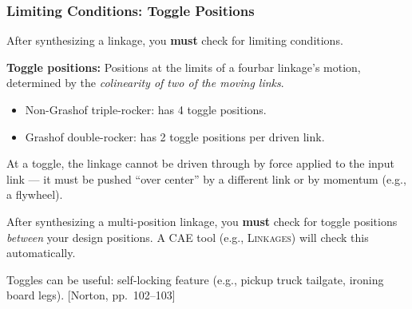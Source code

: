 \documentclass[10pt,aspectratio=43]{beamer}
\newcommand{\pref}[1]{\vfill\hfill{\scriptsize\color{gray}[Norton, pp.~#1]}}
\begin{document}
\begin{frame}
\frametitle{Limiting Conditions: Toggle Positions}

After synthesizing a linkage, you \textbf{must} check for limiting conditions.

\begin{yellowbox}
\textbf{Toggle positions:} Positions at the limits of a fourbar linkage's motion, determined by the \emph{colinearity of two of the moving links}.
\begin{itemize}
  \item Non-Grashof triple-rocker: has 4 toggle positions.
  \item Grashof double-rocker: has 2 toggle positions per driven link.
\end{itemize}
\end{yellowbox}

\vspace{4pt}
At a toggle, the linkage cannot be driven through by force applied to the input link --- it must be pushed ``over center'' by a different link or by momentum (e.g., a flywheel).

\vspace{4pt}
\begin{redbox}
After synthesizing a multi-position linkage, you \textbf{must} check for toggle positions \emph{between} your design positions. A CAE tool (e.g., \textsc{Linkages}) will check this automatically.
\end{redbox}

\vspace{4pt}
Toggles can be useful: self-locking feature (e.g., pickup truck tailgate, ironing board legs).
\pref{102--103}
\end{frame}
\end{document}
